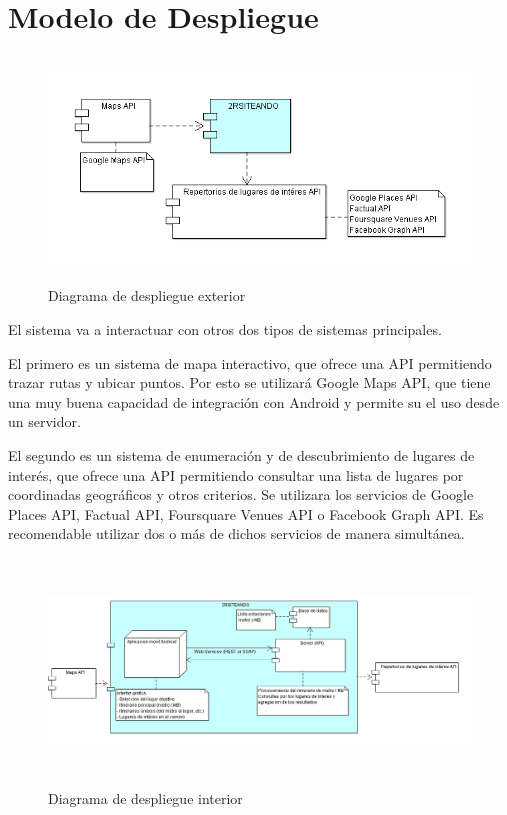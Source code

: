 \section{Modelo de Despliegue}

\begin{figure}[h]

  \centering
  \includegraphics[width=18cm,height=6cm]{Imagenes/Despliegue/modelo_despliegue_exterior.png}
  \caption{Diagrama de despliegue exterior}  

\end{figure}

El sistema va a interactuar con otros dos tipos de sistemas principales.
\newline

El primero es un sistema de mapa interactivo, que ofrece una API permitiendo trazar rutas y ubicar puntos. Por esto se utilizar\'a Google Maps API, que tiene una muy buena capacidad de integraci\'on con Android y permite su el uso desde un servidor.
\newline

El segundo es un sistema de enumeraci\'on y de descubrimiento de lugares de inter\'es, que ofrece una API permitiendo consultar una lista de lugares por coordinadas geogr\'aficos y otros criterios. Se utilizara los servicios de Google Places API, Factual API, Foursquare Venues API o Facebook Graph API. 
Es recomendable utilizar dos o m\'as de dichos servicios de manera simult\'anea.


\begin{figure}[h]

  \centering
  \includegraphics[width=18cm,height=6cm]{Imagenes/Despliegue/modelo_despliegue_interior.png}
  \caption{Diagrama de despliegue interior}  

\end{figure}


